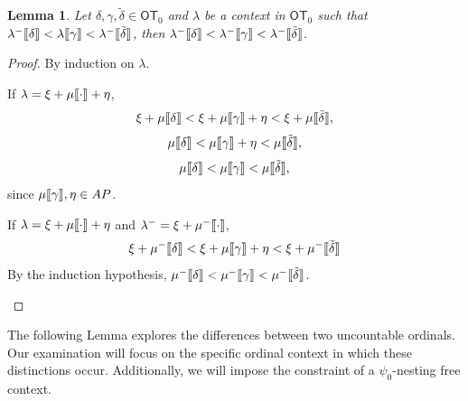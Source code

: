 \documentclass{amsart}
\theoremstyle{plain}
\theoremstyle{plain}
\newtheorem{lemma}[theorem]{Lemma}
\def\scbrl{[\hspace{-.14em}[}
\def\scbrr{]\hspace{-.14em}]}
\def\scbr#1{\scbrl#1\scbrr}
\newcommand\OT{\mathsf{OT}}
\newcommand{\ga}{\gamma}
\newcommand{\de}{\delta}
\newcommand{\la}{\lambda}
\def\scbrl{[\hspace{-.14em}[}
\def\scbrr{]\hspace{-.14em}]}
\def\scbr#1{\scbrl#1\scbrr}
\begin{document}
\begin{lemma}\label{lm:SandwichContext}
Let $\de,\ga,\tilde{\de}\in \OT_0$ and $\la$ be a context in $\OT_0$  such that 
$\la^-\scbr{\de} < \la\scbr{\ga} < \la^-\scbr{\tilde{\de}}$, 
then $\la^-\scbr{\de} < \la^-\scbr{\ga} < \la^-\scbr{\tilde{\de}}$.
\end{lemma}
\begin{proof}
By induction on $\la$.
\begin{Cases}
    \item If $\la=\xi+ \mu\scbr{\cdot}+\eta$,
    $$\xi + \mu\scbr{\de}<\xi + \mu\scbr{\ga}+\eta <\xi + \mu\scbr{\tilde{\de}},$$
    $$\mu\scbr{\de} < \mu\scbr{\ga}+\eta < \mu\scbr{\tilde{\de}},$$
    $$\mu\scbr{\de} < \mu\scbr{\ga} < \mu\scbr{\tilde{\de}},$$
    since $\mu\scbr{\ga},\eta \in AP$.\smallskip

\item 
If $\la=\xi+ \mu\scbr{\cdot}+\eta$ and $\la^-= \xi+ \mu^-\scbr{\cdot}$,
$$\xi + \mu^-\scbr{\de}<\xi + \mu\scbr{\ga}+\eta <\xi + \mu^-\scbr{\tilde{\de}}$$
By the induction hypothesis, 
$\mu^-\scbr{\de} < \mu^-\scbr{\ga} < \mu^-\scbr{\tilde{\de}}$.
\end{Cases}
\end{proof}





The following Lemma explores the differences between two uncountable ordinals. Our examination will focus on the specific ordinal context in which these distinctions occur. Additionally, we will impose the constraint of a $\psi_0$-nesting free context.
\end{document}
